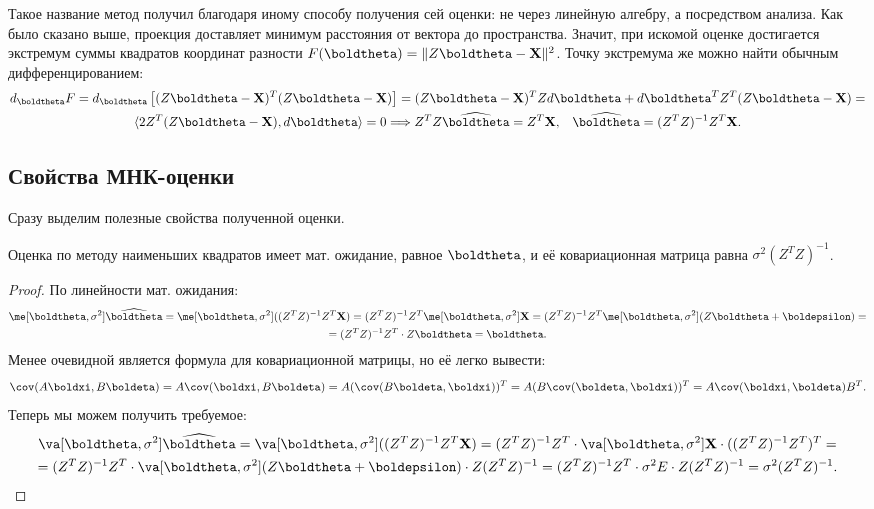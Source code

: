 Такое название метод получил благодаря иному способу получения сей оценки: не через линейную алгебру, а посредством анализа. Как было сказано выше, проекция доставляет минимум расстояния от вектора до пространства. Значит, при искомой оценке достигается экстремум суммы квадратов координат разности $F(\boldtheta) = \|Z\boldtheta - \mathbf X\|^2$. Точку экстремума же можно найти обычным дифференцированием:
\begin{gather*}
    d_{\boldtheta} F = d_{\boldtheta} \left[(Z\boldtheta - \mathbf X)^T(Z\boldtheta - \mathbf X)\right] = (Z\boldtheta - \mathbf X)^T Z d\boldtheta + d\boldtheta^T Z^T(Z\boldtheta - \mathbf X) = \\
    \langle 2Z^T(Z\boldtheta - \mathbf X), d\boldtheta\rangle = 0 \Longrightarrow Z^TZ \widehat{\boldtheta} = Z^T \mathbf X,\;\;\;\widehat{\boldtheta} = (Z^T Z)^{-1} Z^T \mathbf X.
\end{gather*}

\subsection{Свойства МНК-оценки}

Сразу выделим полезные свойства полученной оценки.

\begin{proposition}\label{mnk_prop}
    Оценка по методу наименьших квадратов имеет мат. ожидание, равное $\boldtheta$, и её ковариационная матрица равна $\sigma^2 (Z^T Z)^{-1}$.
\end{proposition}

\begin{proof}
По линейности мат. ожидания:
\begin{gather*}
    \me[\boldtheta, \sigma^2] \widehat{\boldtheta} = \me[\boldtheta, \sigma^2] ((Z^T Z)^{-1} Z^T \mathbf X) = (Z^T Z)^{-1} Z^T \me[\boldtheta, \sigma^2] \mathbf X = (Z^T Z)^{-1} Z^T \me[\boldtheta, \sigma^2] (Z\boldtheta + \boldepsilon) = \\
    = (Z^T Z)^{-1} Z^T \cdot Z\boldtheta = \boldtheta.
\end{gather*}
Менее очевидной является формула для ковариационной матрицы, но её легко вывести:
\[
\cov(A\boldxi, B\boldeta) = A\cov(\boldxi, B\boldeta) = A(\cov(B\boldeta, \boldxi))^T = A(B\cov(\boldeta, \boldxi))^T = A\cov(\boldxi, \boldeta)B^T.
\]
Теперь мы можем получить требуемое:
\begin{gather*}
\va[\boldtheta, \sigma^2] \widehat{\boldtheta} = \va[\boldtheta, \sigma^2] ((Z^T Z)^{-1} Z^T \mathbf X) = (Z^T Z)^{-1} Z^T \cdot \va[\boldtheta, \sigma^2] \mathbf X \cdot ((Z^T Z)^{-1} Z^T)^T = \\
= (Z^T Z)^{-1} Z^T \cdot \va[\boldtheta, \sigma^2] (Z\boldtheta + \boldepsilon) \cdot Z (Z^T Z)^{-1} = (Z^T Z)^{-1} Z^T \cdot \sigma^2 E \cdot Z (Z^T Z)^{-1} = \sigma^2 (Z^T Z)^{-1}.
\end{gather*}
\end{proof}

